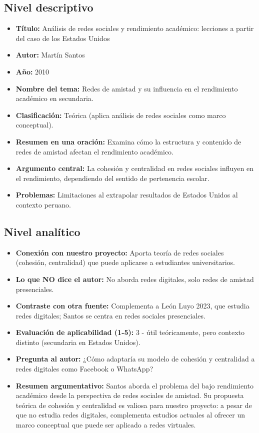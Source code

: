 \documentclass[12pt]{article}
\begin{document}
\subsection*{Nivel descriptivo}
\begin{itemize}
  \item \textbf{Título:} Análisis de redes sociales y rendimiento académico: lecciones a partir del caso de los Estados Unidos
  \item \textbf{Autor:} Martín Santos
  \item \textbf{Año:} 2010
  \item \textbf{Nombre del tema:} Redes de amistad y su influencia en el rendimiento académico en secundaria.
  \item \textbf{Clasificación:} Teórica (aplica análisis de redes sociales como marco conceptual).
  \item \textbf{Resumen en una oración:} Examina cómo la estructura y contenido de redes de amistad afectan el rendimiento académico.
  \item \textbf{Argumento central:} La cohesión y centralidad en redes sociales influyen en el rendimiento, dependiendo del sentido de pertenencia escolar.
  \item \textbf{Problemas:} Limitaciones al extrapolar resultados de Estados Unidos al contexto peruano.
\end{itemize}

\subsection*{Nivel analítico}
\begin{itemize}
  \item \textbf{Conexión con nuestro proyecto:} Aporta teoría de redes sociales (cohesión, centralidad) que puede aplicarse a estudiantes universitarios.
  \item \textbf{Lo que NO dice el autor:} No aborda redes digitales, solo redes de amistad presenciales.
  \item \textbf{Contraste con otra fuente:} Complementa a León Luyo 2023, que estudia redes digitales; Santos se centra en redes sociales presenciales.
  \item \textbf{Evaluación de aplicabilidad (1-5):} 3 - útil teóricamente, pero contexto distinto (secundaria en Estados Unidos).
  \item \textbf{Pregunta al autor:} ¿Cómo adaptaría su modelo de cohesión y centralidad a redes digitales como Facebook o WhatsApp?
  \item \textbf{Resumen argumentativo:} Santos aborda el problema del bajo rendimiento académico desde la perspectiva de redes sociales de amistad. Su propuesta teórica de cohesión y centralidad es valiosa para nuestro proyecto: a pesar de que no estudia redes digitales, complementa estudios actuales al ofrecer un marco conceptual que puede ser aplicado a redes virtuales.
\end{itemize}
\end{document}
